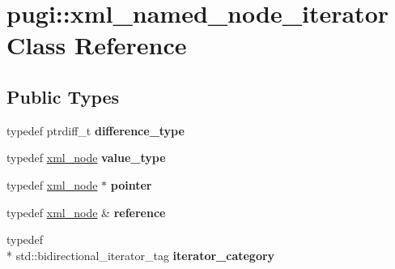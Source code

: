 \hypertarget{classpugi_1_1xml__named__node__iterator}{\section{pugi\+:\+:xml\+\_\+named\+\_\+node\+\_\+iterator Class Reference}
\label{classpugi_1_1xml__named__node__iterator}
}
\subsection*{Public Types}
\begin{DoxyCompactItemize}
\item 
\hypertarget{classpugi_1_1xml__named__node__iterator_a18fa0d610fea4d64271729abc0e28849}{typedef ptrdiff\+\_\+t {\bfseries difference\+\_\+type}}\label{classpugi_1_1xml__named__node__iterator_a18fa0d610fea4d64271729abc0e28849}

\item 
\hypertarget{classpugi_1_1xml__named__node__iterator_a8d98d8218ea9740ceb990ef2c1a456e2}{typedef \hyperlink{classpugi_1_1xml__node}{xml\+\_\+node} {\bfseries value\+\_\+type}}\label{classpugi_1_1xml__named__node__iterator_a8d98d8218ea9740ceb990ef2c1a456e2}

\item 
\hypertarget{classpugi_1_1xml__named__node__iterator_aebf72c68ded20cf483a10c6b94aa3f57}{typedef \hyperlink{classpugi_1_1xml__node}{xml\+\_\+node} $\ast$ {\bfseries pointer}}\label{classpugi_1_1xml__named__node__iterator_aebf72c68ded20cf483a10c6b94aa3f57}

\item 
\hypertarget{classpugi_1_1xml__named__node__iterator_a1c338c7a2aefe04b83f746a963df808b}{typedef \hyperlink{classpugi_1_1xml__node}{xml\+\_\+node} \& {\bfseries reference}}\label{classpugi_1_1xml__named__node__iterator_a1c338c7a2aefe04b83f746a963df808b}

\item 
\hypertarget{classpugi_1_1xml__named__node__iterator_ab7dad0df34f043a9458b2a6b309a227f}{typedef \\*
std\+::bidirectional\+\_\+iterator\+\_\+tag {\bfseries iterator\+\_\+category}}\label{classpugi_1_1xml__named__node__iterator_ab7dad0df34f043a9458b2a6b309a227f}

\end{DoxyCompactItemize}
